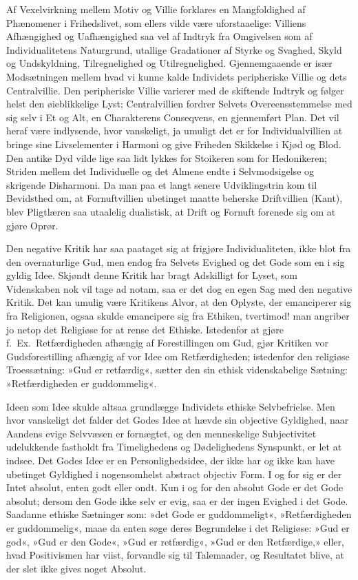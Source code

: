 \documentclass[12pt]{book}
\newcommand{\apage}[1]{\marginnote{\footnotesize\textit{[#1]}}}
\begin{document}
Af Vexelvirkning mellem Motiv og Villie forklares en Mangfoldighed af
Phænomener i Frihedslivet, som ellers vilde være uforstaaelige: Villiens
Afhængighed \apage{262} og Uafhængighed saa vel af Indtryk fra Omgivelsen som af
Individualitetens Naturgrund, utallige Gradationer af Styrke og Svaghed, Skyld
og Undskyldning, Tilregnelighed og Utilregnelighed. Gjennemgaaende er især
Modsætningen mellem hvad vi kunne kalde Individets peripheriske Villie og dets
Centralvillie. Den peripheriske Villie varierer med de skiftende Indtryk og
følger helst den øieblikkelige Lyst; Centralvillien fordrer Selvets
Overeensstemmelse med sig selv i Et og Alt, en Charakterens Conseqvens, en
gjennemført Plan. Det vil heraf være indlysende, hvor vanskeligt, ja umuligt
det er for Individualvillien at bringe sine Livselementer i Harmoni og give
Friheden Skikkelse i Kjød og Blod. Den antike Dyd vilde lige saa lidt lykkes
for Stoikeren som for Hedonikeren; Striden mellem det Individuelle og det
Almene endte i Selvmodsigelse og skrigende Disharmoni. Da man paa et langt
senere Udviklingstrin kom til Bevidsthed om, at Fornuftvillien ubetinget
maatte beherske Driftvillien (Kant), blev Pligtlæren saa utaalelig dualistisk,
at Drift og Fornuft forenede sig om at gjøre Oprør.

Den negative Kritik har saa paataget sig at frigjøre Individualiteten, ikke
blot fra den overnaturlige Gud, men endog fra Selvets Evighed og det Gode som
en i sig gyldig Idee. Skjøndt denne Kritik har bragt Adskilligt for Lyset, som
Videnskaben nok vil tage ad notam, saa er det dog en egen Sag med den
negative Kritik. Det kan umulig være Kritikens Alvor, at den Oplyste, der
emanciperer sig fra Religionen, ogsaa skulde emancipere sig fra Ethiken,  \apage{263}
tvertimod! man angriber jo netop det Religiøse for at rense det Ethiske.
Istedenfor at gjøre f.\ Ex.\ Retfærdigheden afhængig af Forestillingen om
Gud, gjør Kritiken vor Gudsforestilling afhængig af vor Idee om
Retfærdigheden; istedenfor den religiøse Troessætning: »Gud er retfærdig«,
sætter den sin ethisk videnskabelige Sætning: »Retfærdigheden er
guddommelig«.

Ideen som Idee skulde altsaa grundlægge Individets ethiske Selvbefrielse. Men
hvor vanskeligt det falder det Godes Idee at hævde sin objective Gyldighed,
naar Aandens evige Selvvæsen er fornægtet, og den menneskelige Subjectivitet
udelukkende fastholdt fra Timelighedens og Dødelighedens Synspunkt, er let at
indsee. Det Godes Idee er en Personlighedsidee, der ikke har og ikke kan have
ubetinget Gyldighed i nogensomhelst abstract objectiv Form. I og for sig er
der Intet absolut, enten godt eller ondt. Kun i og for den absolut Gode er det
Gode absolut; dersom den Gode ikke selv er evig, saa er der ingen Evighed i
det Gode. Saadanne ethiske Sætninger som: »det Gode er guddommeligt«,
»Retfærdigheden er guddommelig«, maae da enten søge deres Begrundelse i det
Religiøse: »Gud er god«, »Gud er den Gode«, »Gud er retfærdig«, »Gud er den
Retfærdige,» eller, hvad Positivismen har viist, forvandle sig til
Talemaader, og Resultatet blive, at der slet ikke gives noget Absolut.
\end{document}

